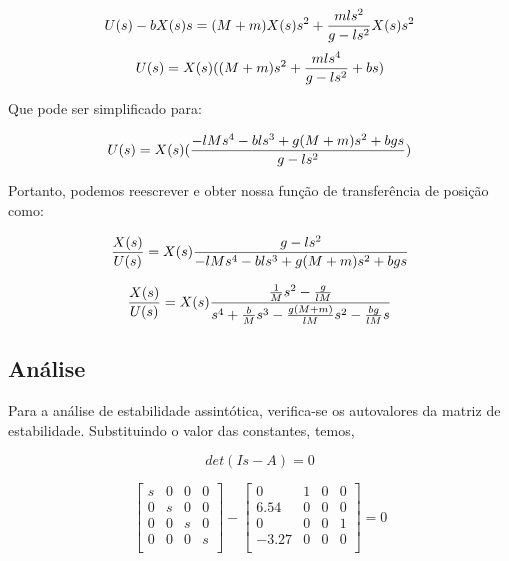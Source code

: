 \documentclass[a4paper, 12pt]{article}
\begin{document}
\begin{equation}
    U(s)-bX(s)s = (M+m)X(s)s^2+\frac{mls^2}{g-ls^2}X(s)s^2\\
\end{equation}
\begin{equation}
    U(s) = X(s)((M+m)s^2+\frac{mls^4}{g-ls^2}+bs)\\
\end{equation}

Que pode ser simplificado para:

\begin{equation}
    U(s) = X(s)(\frac{-lMs^4-bls^3+g(M+m)s^2+bgs}{g-ls^2})\\
\end{equation}

Portanto, podemos reescrever e obter nossa função de transferência de posição como:

\begin{equation}
    \frac{X(s)}{U(s)} = X(s)\frac{g-ls^2}{-lMs^4-bls^3+g(M+m)s^2+bgs}\\
\end{equation}

\begin{equation}
    \frac{X(s)}{U(s)} = X(s)\frac{\frac{1}{M}s^2-\frac{g}{lM}}{s^4+\frac{b}{M}s^3-\frac{g(M+m)}{lM}s^2-\frac{bg}{lM}s}\\
\end{equation}

\subsection{Análise}
Para a análise de estabilidade assintótica, verifica-se os autovalores da matriz de estabilidade. Substituindo o valor das constantes, temos,


\begin{equation}
        det(Is - A) = 0
\end{equation}

\begin{equation}
\begin{bmatrix}
s & 0 & 0 & 0\\
0 & s & 0 & 0\\
0 & 0 & s & 0\\
0 & 0 & 0 & s\\
\end{bmatrix}
-
\begin{bmatrix}
0 & 1 & 0 & 0\\
6.54 & 0 & 0 & 0\\
0 & 0 & 0 & 1\\
-3.27 & 0 & 0 & 0\\
\end{bmatrix}
= 0
\end{equation}
\end{document}
